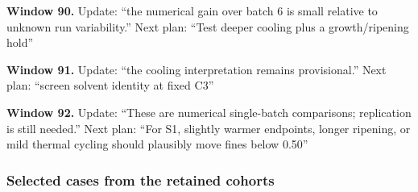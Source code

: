 \documentclass[10pt,a4paper]{article}
\begin{document}
\textbf{Window 90.} Update: ``the numerical gain over batch 6 is small relative to unknown run variability.'' Next plan: ``Test deeper cooling plus a growth/ripening hold''

\textbf{Window 91.} Update: ``the cooling interpretation remains provisional.'' Next plan: ``screen solvent identity at fixed C3''

\textbf{Window 92.} Update: ``These are numerical single-batch comparisons; replication is still needed.'' Next plan: ``For S1, slightly warmer endpoints, longer ripening, or mild thermal cycling should plausibly move fines below 0.50''

\subsubsection{Selected cases from the retained cohorts}\label{selected-cases-from-the-retained-cohorts}
\end{document}
